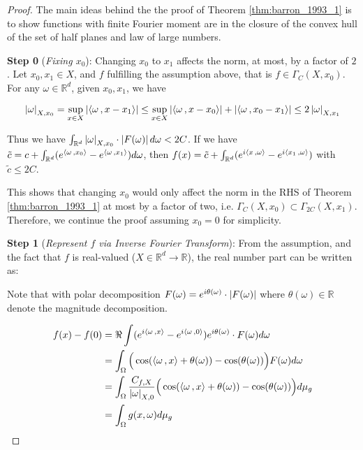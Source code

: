 \begin{proof}

The main ideas behind the the proof of Theorem \ref{thm:barron_1993_1} is to
show functions with finite Fourier moment are in the closure of the convex hull of the
set of half planes and law of large numbers.

\textbf{Step 0} (\textit{Fixing $x_0$}): Changing $x_0$ to $x_1$ 
affects the norm, at most, by a factor of $2$.
Let $x_0, x_1 \in X$, and $f$ fulfilling the assumption above, that is $f \in \Gamma_C(X, x_0)$. 
For any $\omega \in \mathbb{R}^d$, given $x_0, x_1$, we have

\begin{equation}
    \left| \omega \right|_{X, x_0} = \sup_{x\in X}\left| \left\langle \omega\, , x-x_1 \right\rangle \right| \leq \sup_{x\in X}\left| \left\langle \omega\, , x-x_0 \right\rangle \right| + \left| \left\langle \omega\, , x_0-x_1 \right\rangle \right| \leq 2\left| \omega \right|_{X, x_1}
\end{equation}

Thus we have $\int_{\mathbb{R}^d} \left| \omega \right|_{X, x_0} \cdot \left| F(\omega) \right| d\omega < 2C$.
If we have $\tilde{c} = c + \int_{\mathbb{R}^d} (e^{\left\langle \omega\, , x_0 \right\rangle} - e^{\left\langle \omega\, , x_1 \right\rangle}) d\omega$, 
then $f(x) = \tilde{c} + \int_{\mathbb{R}^d} (e^{i\left\langle x\, , \omega \right\rangle} - e^{i\left\langle x_1\, , \omega \right\rangle})$ with $\tilde{c} \leq 2C$.

This shows that changing $x_0$ would only affect the norm in the RHS of Theorem \ref{thm:barron_1993_1}
at most by a factor of two, i.e. $\Gamma_C(X, x_0) \subset \Gamma_{2C}(X, x_1)$.
Therefore, we continue the proof assuming $x_0 = 0$ for simplicity.

\textbf{Step 1} (\textit{Represent $f$ via Inverse Fourier Transform}): From the assumption,
and the fact that $f$ is real-valued ($X \in \mathbb{R}^d \to \mathbb{R}$),
the real number part can be written as:

Note that with polar decomposition $F(\omega) = e^{i\theta(\omega)} \cdot \left| F(\omega) \right|$ where $\theta(\omega) \in \mathbb{R}$ denote the magnitude decomposition.

\begin{align}
    f(x) - f(0) 
    &= \Re \int (e^{i\left\langle \omega\, , x \right\rangle} - e^{i\left\langle \omega\, , 0 \right\rangle}) e^{i\theta(\omega)} \cdot F(\omega) d\omega \\
    &= \int_{\Omega}\Big(\cos(\left\langle \omega\, , x \right\rangle + \theta(\omega)) - \cos(\theta(\omega))\Big)  
    F(\omega) d\omega \\
    &= \int_{\Omega} \frac{C_{f,X}}{\left| \omega \right|_{X, 0}}\Big(\cos(\left\langle \omega\, , x \right\rangle + \theta(\omega)) - \cos(\theta(\omega))\Big) d\mu_g \\
    &= \int_{\Omega} g(x, \omega) d\mu_g \label{eq:barron_fouier_int}
\end{align}


\end{proof}
